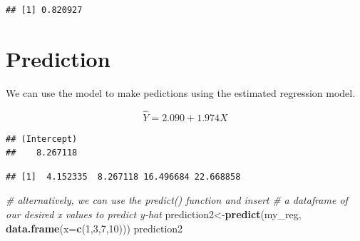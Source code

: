 \documentclass[]{book}
\newenvironment{Shaded}{\begin{snugshade}}{\end{snugshade}}
\newcommand{\KeywordTok}[1]{\textcolor[rgb]{0.13,0.29,0.53}{\textbf{#1}}}
\newcommand{\DataTypeTok}[1]{\textcolor[rgb]{0.13,0.29,0.53}{#1}}
\newcommand{\DecValTok}[1]{\textcolor[rgb]{0.00,0.00,0.81}{#1}}
\newcommand{\CommentTok}[1]{\textcolor[rgb]{0.56,0.35,0.01}{\textit{#1}}}
\newcommand{\OperatorTok}[1]{\textcolor[rgb]{0.81,0.36,0.00}{\textbf{#1}}}
\newcommand{\NormalTok}[1]{#1}
\theoremstyle{definition}
\theoremstyle{definition}
\theoremstyle{definition}
\theoremstyle{remark}
\begin{document}
\begin{verbatim}
## [1] 0.820927
\end{verbatim}

\section{Prediction}\label{prediction}

We can use the model to make pedictions using the estimated regression
model.

\[\hat{Y}=2.090+1.974X\]

\begin{Shaded}
\end{Shaded}

\begin{verbatim}
## (Intercept) 
##    8.267118
\end{verbatim}

\begin{Shaded}
\end{Shaded}

\begin{verbatim}
## [1]  4.152335  8.267118 16.496684 22.668858
\end{verbatim}

\begin{Shaded}
\begin{Highlighting}[]
\CommentTok{# alternatively, we can use the predict() function and insert }
\CommentTok{# a dataframe of our desired x values to predict y-hat}
\NormalTok{prediction2<-}\KeywordTok{predict}\NormalTok{(my_reg, }\KeywordTok{data.frame}\NormalTok{(}\DataTypeTok{x=}\KeywordTok{c}\NormalTok{(}\DecValTok{1}\NormalTok{,}\DecValTok{3}\NormalTok{,}\DecValTok{7}\NormalTok{,}\DecValTok{10}\NormalTok{)))}
\NormalTok{prediction2}
\end{Highlighting}
\end{Shaded}
\end{document}
